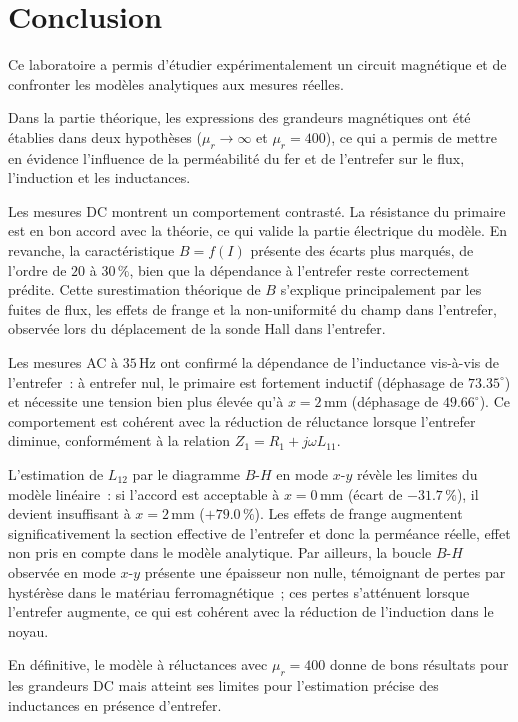 \section{Conclusion}

Ce laboratoire a permis d'étudier expérimentalement un circuit magnétique et de confronter les modèles analytiques aux mesures réelles.

Dans la partie théorique, les expressions des grandeurs magnétiques ont été 
établies dans deux hypothèses ($\mu_r \to \infty$ et $\mu_r = 400$), ce qui a 
permis de mettre en évidence l'influence de la perméabilité du fer et de 
l'entrefer sur le flux, l'induction et les inductances.

Les mesures DC montrent un comportement contrasté. La résistance du primaire 
est en bon accord avec la théorie, ce qui valide la partie électrique du 
modèle. En revanche, la caractéristique $B = f(I)$ présente des écarts plus 
marqués, de l'ordre de $20$ à $30\,\%$, bien que la dépendance à l'entrefer 
reste correctement prédite. Cette surestimation théorique de $B$ s'explique 
principalement par les fuites de flux, les effets de frange et la 
non-uniformité du champ dans l'entrefer, observée lors du déplacement de la 
sonde Hall dans l'entrefer.

Les mesures AC à $35\,\text{Hz}$ ont confirmé la dépendance de l'inductance 
vis-à-vis de l'entrefer~: à entrefer nul, le primaire est fortement inductif 
(déphasage de $73.35^\circ$) et nécessite une tension bien plus élevée qu'à 
$x = 2\,\text{mm}$ (déphasage de $49.66^\circ$). Ce comportement est cohérent 
avec la réduction de réluctance lorsque l'entrefer diminue, conformément à 
la relation $Z_1 = R_1 + j\omega L_{11}$.

L'estimation de $L_{12}$ par le diagramme $B$-$H$ en mode $x$-$y$ révèle les 
limites du modèle linéaire~: si l'accord est acceptable à $x = 0\,\text{mm}$ 
(écart de $-31.7\,\%$), il devient insuffisant à $x = 2\,\text{mm}$ 
($+79.0\,\%$). Les effets de frange augmentent significativement la section 
effective de l'entrefer et donc la perméance réelle, effet non pris en compte 
dans le modèle analytique. Par ailleurs, la boucle $B$-$H$ observée en mode 
$x$-$y$ présente une épaisseur non nulle, témoignant de pertes par hystérèse 
dans le matériau ferromagnétique~; ces pertes s'atténuent lorsque l'entrefer 
augmente, ce qui est cohérent avec la réduction de l'induction dans le noyau.

En définitive, le modèle à réluctances avec $\mu_r = 400$ donne de bons 
résultats pour les grandeurs DC mais atteint ses limites pour l'estimation 
précise des inductances en présence d'entrefer.